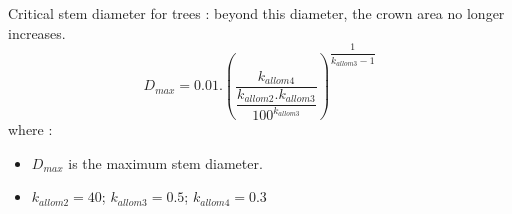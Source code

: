 Critical stem diameter for trees : beyond this diameter, the crown area no longer increases.
\begin{equation}
D_{max} = 0.01 .\left( \frac{k_{allom4}}{\dfrac{k_{allom2}.k_{allom3}}{100^{k_{allom3}}}} \right)^{\dfrac{1}{k_{allom3} - 1}}
\end{equation}
where : \\
\begin{itemize}
 \item  $D_{max}$ is the maximum stem diameter.
 \item  $ k_{allom2} = 40$; \quad  $k_{allom3}= 0.5$; \quad  $k_{allom4}= 0.3$
\end{itemize}

